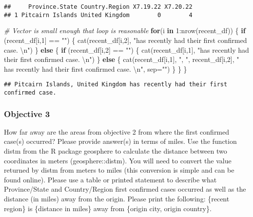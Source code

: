 \documentclass[
]{article}
\newenvironment{Shaded}{\begin{snugshade}}{\end{snugshade}}
\newcommand{\AttributeTok}[1]{\textcolor[rgb]{0.77,0.63,0.00}{#1}}
\newcommand{\CommentTok}[1]{\textcolor[rgb]{0.56,0.35,0.01}{\textit{#1}}}
\newcommand{\ControlFlowTok}[1]{\textcolor[rgb]{0.13,0.29,0.53}{\textbf{#1}}}
\newcommand{\DecValTok}[1]{\textcolor[rgb]{0.00,0.00,0.81}{#1}}
\newcommand{\FunctionTok}[1]{\textcolor[rgb]{0.00,0.00,0.00}{#1}}
\newcommand{\NormalTok}[1]{#1}
\newcommand{\SpecialCharTok}[1]{\textcolor[rgb]{0.00,0.00,0.00}{#1}}
\newcommand{\StringTok}[1]{\textcolor[rgb]{0.31,0.60,0.02}{#1}}
\begin{document}
\begin{verbatim}
##     Province.State Country.Region X7.19.22 X7.20.22
## 1 Pitcairn Islands United Kingdom        0        4
\end{verbatim}

\begin{Shaded}
\begin{Highlighting}[]
\CommentTok{\# Vector is small enough that loop is reasonable}
\ControlFlowTok{for}\NormalTok{(i }\ControlFlowTok{in} \DecValTok{1}\SpecialCharTok{:}\FunctionTok{nrow}\NormalTok{(recent\_df))}
\NormalTok{\{}
  \ControlFlowTok{if}\NormalTok{ (recent\_df[i,}\DecValTok{1}\NormalTok{] }\SpecialCharTok{==} \StringTok{""}\NormalTok{) \{}
    \FunctionTok{cat}\NormalTok{(recent\_df[i,}\DecValTok{2}\NormalTok{], }\StringTok{"has recently had their first confirmed case. }\SpecialCharTok{\textbackslash{}n}\StringTok{"}\NormalTok{)}
\NormalTok{  \} }\ControlFlowTok{else}\NormalTok{ \{}
    \ControlFlowTok{if}\NormalTok{ (recent\_df[i,}\DecValTok{2}\NormalTok{] }\SpecialCharTok{==} \StringTok{""}\NormalTok{) \{}
      \FunctionTok{cat}\NormalTok{(recent\_df[i,}\DecValTok{1}\NormalTok{], }\StringTok{"has recently had their first confirmed case. }\SpecialCharTok{\textbackslash{}n}\StringTok{"}\NormalTok{)}
\NormalTok{    \} }\ControlFlowTok{else}\NormalTok{ \{}
      \FunctionTok{cat}\NormalTok{(recent\_df[i,}\DecValTok{1}\NormalTok{], }\StringTok{", "}\NormalTok{, recent\_df[i,}\DecValTok{2}\NormalTok{], }
          \StringTok{" has recently had their first confirmed case. }\SpecialCharTok{\textbackslash{}n}\StringTok{"}\NormalTok{, }\AttributeTok{sep=}\StringTok{""}\NormalTok{)}
\NormalTok{    \}}
\NormalTok{  \}}
\NormalTok{\}}
\end{Highlighting}
\end{Shaded}

\begin{verbatim}
## Pitcairn Islands, United Kingdom has recently had their first confirmed case.
\end{verbatim}

\hypertarget{objective-3}{%
\subsubsection{Objective 3}\label{objective-3}}

How far away are the areas from objective 2 from where the first
confirmed case(s) occurred? Please provide answer(s) in terms of miles.
Use the function distm from the R package geosphere to calculate the
distance between two coordinates in meters (geosphere::distm). You will
need to convert the value returned by distm from meters to miles (this
conversion is simple and can be found online). Please use a table or
printed statement to describe what Province/State and Country/Region
first confirmed cases occurred as well as the distance (in miles) away
from the origin. Please print the following: \{recent region\} is
\{distance in miles\} away from \{origin city, origin country\}.
\end{document}
